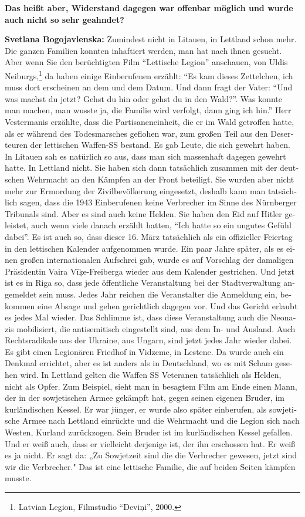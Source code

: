 \begin{otherlanguage}{ngerman}
\textbf{Das heißt aber, Widerstand dagegen war offenbar möglich und wurde auch nicht so sehr geahndet?}

\textbf{Svetlana Bogojavlenska:} Zumindest nicht in Litauen, in Lettland schon mehr. Die ganzen Familien konnten inhaftiert werden, man hat nach ihnen gesucht. Aber wenn Sie den berüchtigten Film "`Lettische Legion"' anschauen, von Uldis Neiburgs,\footnote{Latvian Legion, Filmstudio "`Deviņi"', 2000.} da haben einige Einberufenen erzählt: "`Es kam dieses Zettelchen, ich muss dort erscheinen an dem und dem Datum. Und dann fragt der Vater: "`Und was machst du jetzt? Gehst du hin oder gehst du in den Wald?"'. Was konnte man machen, man wusste ja, die Familie wird verfolgt, dann ging ich hin."' Herr Vestermanis erzählte, dass die Partisaneneinheit, die er im Wald getroffen hatte, als er während des Todesmarsches geflohen war, zum großen Teil aus den Deserteuren der lettischen Waffen-SS bestand. Es gab Leute, die sich gewehrt haben. In Litauen sah es natürlich so aus, dass man sich massenhaft dagegen gewehrt hatte. In Lettland nicht. Sie haben sich dann tatsächlich zusammen mit der deutschen Wehrmacht an den Kämpfen an der Front beteiligt. Sie wurden aber nicht mehr zur Ermordung der Zivilbevölkerung eingesetzt, deshalb kann man tatsächlich sagen, dass die 1943 Einberufenen keine Verbrecher im Sinne des Nürnberger Tribunals sind. Aber es sind auch keine Helden. Sie haben den Eid auf Hitler geleistet, auch wenn viele danach erzählt hatten, "`Ich hatte so ein ungutes Gefühl dabei"'. Es ist auch so, dass dieser 16. März tatsächlich als ein offizieller Feiertag in den lettischen Kalender aufgenommen wurde. Ein paar Jahre später, als es einen großen internationalen Aufschrei gab, wurde es auf Vorschlag der damaligen Präsidentin Vaira Vīķe-Freiberga wieder aus dem Kalender gestrichen. Und jetzt ist es in Riga so, dass jede öffentliche Veranstaltung bei der Stadtverwaltung angemeldet sein muss. Jedes Jahr reichen die Veranstalter die Anmeldung ein, bekommen eine Absage und gehen gerichtlich dagegen vor. Und das Gericht erlaubt es jedes Mal wieder. Das Schlimme ist, dass diese Veranstaltung auch die Neonazis mobilisiert, die antisemitisch eingestellt sind, aus dem In- und Ausland. Auch Rechtsradikale aus der Ukraine, aus Ungarn, sind jetzt jedes Jahr wieder dabei.
Es gibt einen Legionären Friedhof in Vidzeme, in Lestene. Da wurde auch ein Denkmal errichtet, aber es ist anders als in Deutschland, wo es mit Scham gesehen wird. In Lettland gelten die Waffen SS Veteranen tatsächlich als Helden, nicht als Opfer. Zum Beispiel, sieht man in besagtem Film am Ende einen Mann, der in der sowjetischen Armee gekämpft hat, gegen seinen eigenen Bruder, im kurländischen Kessel. Er war jünger, er wurde also später einberufen, als sowjetische Armee nach Lettland einrückte und die Wehrmacht und die Legion sich nach Westen, Kurland zurückzogen. Sein Bruder ist im kurländischen Kessel gefallen. Und er weiß auch, dass er vielleicht derjenige ist, der ihn erschossen hat. Er weiß es ja nicht. Er sagt da: „Zu Sowjetzeit sind die die Verbrecher gewesen, jetzt sind wir die Verbrecher." Das ist eine lettische Familie, die auf beiden Seiten kämpfen musste.

\end{otherlanguage}
